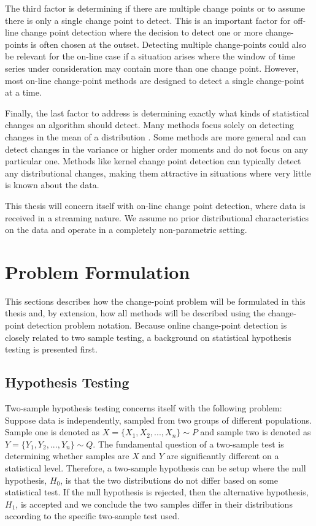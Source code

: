 The third factor is determining if there are multiple change points or to assume there is only a single change point to detect. This is an important  factor for off-line change point detection where the decision to detect one or more change-points is often chosen at the outset.  Detecting multiple change-points could also be relevant for the on-line case if a situation arises where the window of time series under consideration may contain more than one change point. However, most on-line change-point methods are designed to detect a single change-point at a time.

Finally, the last factor to address is determining exactly what kinds of statistical changes an algorithm should detect. Many methods focus solely on detecting changes in the mean of a distribution \cite{lee2010change}. Some methods are more general and can detect changes in the variance or higher order moments and do not focus on any particular one. Methods like kernel change point detection can typically detect any distributional changes, making them attractive in situations where very little is known about the data.

This thesis will concern itself with on-line change point detection, where data is received in a streaming nature. We assume no prior distributional characteristics on the data and operate in a completely non-parametric setting. 

\section{Problem Formulation}
This sections describes how the change-point problem will be formulated in this thesis and, by extension, how all methods will be described using the change-point detection problem notation. Because online change-point detection is closely related to two sample testing, a background on statistical hypothesis testing is presented first. 

\subsection{Hypothesis Testing}

Two-sample hypothesis testing concerns itself with the following problem: Suppose data is independently, sampled from two groups of different populations. Sample one is denoted as  $X=\{X_1, X_2, ...,X_n\} \sim P$ and sample two is denoted as $Y=\{Y_1, Y_2, ...,Y_n\} \sim Q$. The fundamental question of a two-sample test is determining whether samples are $X$ and $Y$ are significantly different on a statistical level. Therefore, a two-sample hypothesis can be setup where the null hypothesis, $H_0$, is that the two distributions do not differ based on some statistical test. If the null hypothesis is rejected, then the alternative hypothesis, $H_1$, is accepted and we conclude the two samples differ in their distributions according to the specific two-sample test used.

